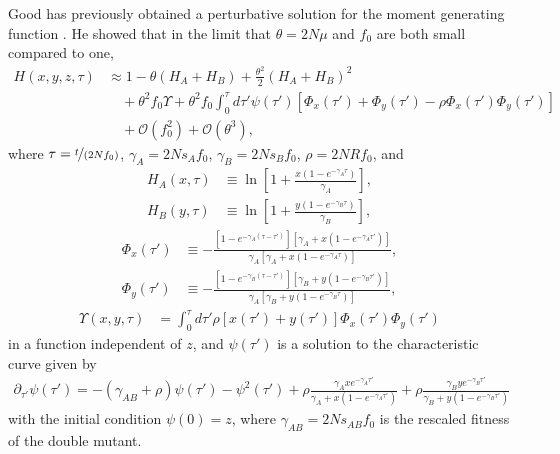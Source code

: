 \documentclass[aps,rmp,twocolumn,groupedaddress,floatfix,notitlepage]{revtex4-1}
\begin{document}
Good has previously obtained a perturbative solution for the moment generating function \autocite{good_2022}. He showed that in the limit that $\theta = 2N\mu$ and $f_0$ are both small compared to one, 
\begin{align}\label{eq:h_expansion}
    H(x, y, z, \tau) &\approx 1 -\theta (H_A + H_B)
    + \frac{\theta^2}{2}\left(H_A + H_B\right)^2 \\\nonumber
    &\quad + \theta^2f_0\Upsilon + \theta^2f_0\int_0^{\tau}d \tau' \psi(\tau') \left[\Phi_x(\tau')+\Phi_y(\tau')-\rho\Phi_x(\tau')\Phi_y(\tau')\right] \\\nonumber
    &\quad + \mathcal{O}(f_0^2) +\mathcal{O}(\theta^3),
\end{align}
where $\tau = \nicefrac{t}{(2Nf_0)}$, $\gamma_A = 2Ns_Af_0$, $\gamma_B = 2Ns_Bf_0$, $\rho = 2NRf_0$, and
\begin{subequations}\begin{align}
    H_A(x, \tau) &\equiv \ln \left[1 + \frac{x(1-e^{-\gamma_A\tau})}{\gamma_A}\right], \\
    H_B(y, \tau) &\equiv \ln \left[1 + \frac{y(1-e^{-\gamma_B\tau})}{\gamma_B}\right],
\end{align}\end{subequations}
\begin{subequations}\begin{align}
    \Phi_x(\tau') &\equiv -\frac{[ 1-e^{-\gamma_A (\tau-\tau')} ][\gamma_A+x(1-e^{-\gamma_A \tau'})]}{\gamma_A \left[ \gamma_A+x(1-e^{-\gamma_A \tau}) \right]}, \\
    \Phi_y(\tau') &\equiv -\frac{[1-e^{-\gamma_B (\tau-\tau')}][\gamma_B+y(1-e^{-\gamma_B \tau'})]}{\gamma_A \left[ \gamma_B+y(1-e^{-\gamma_B \tau}) \right]},
\end{align}\end{subequations}
\begin{align}
    \Upsilon(x, y, \tau) &= \int_0^{\tau} d\tau' \rho \left[x(\tau') + y(\tau')\right]\Phi_x(\tau')\Phi_y(\tau')
\end{align}
in a function independent of $z$, and $\psi(\tau')$ is a solution to the characteristic curve given by
\begin{align}\label{eq:psi_general_eq}
    \partial_{\tau'} \psi(\tau') = -(\gamma_{AB} + \rho) \psi(\tau') - \psi^2(\tau') + \rho \frac{\gamma_Axe^{-\gamma_A\tau'}}{\gamma_A+x(1-e^{-\gamma_A\tau'})} + \rho \frac{\gamma_Bye^{-\gamma_B\tau'}}{\gamma_B+y(1-e^{-\gamma_B\tau'})}
\end{align}
with the initial condition $\psi(0)=z$, where $\gamma_{AB}=2Ns_
{AB}f_0$ is the rescaled fitness of the double mutant.
\end{document}
